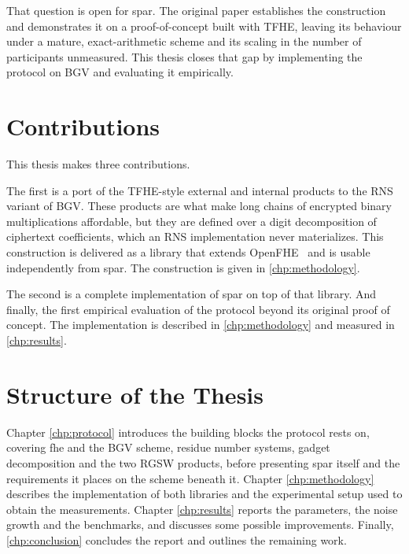 That question is open for \gls{spar}. The original paper establishes the construction and demonstrates it on a proof-of-concept built with TFHE, leaving its behaviour under a mature, exact-arithmetic scheme and its scaling in the number of participants unmeasured. This thesis closes that gap by implementing the protocol on BGV and evaluating it empirically.

\section{Contributions}
This thesis makes three contributions.

The first is a port of the TFHE-style external and internal products to the RNS variant of BGV. These products are what make long chains of encrypted binary multiplications affordable, but they are defined over a digit decomposition of ciphertext coefficients, which an RNS implementation never materializes. This construction is delivered as a library that extends OpenFHE~\cite{cryptoeprint:2022/915} and is usable independently from \gls{spar}. The construction is given in \autoref{chp:methodology}.

The second is a complete implementation of \gls{spar} on top of that library. And finally, the first empirical evaluation of the protocol beyond its original proof of concept. The implementation is described in \autoref{chp:methodology} and measured in \autoref{chp:results}.

\section{Structure of the Thesis}
Chapter \ref{chp:protocol} introduces the building blocks the protocol rests on, covering \gls{fhe} and the BGV scheme, residue number systems, gadget decomposition and the two RGSW products, before presenting \gls{spar} itself and the requirements it places on the scheme beneath it. Chapter \ref{chp:methodology} describes the implementation of both libraries and the experimental setup used to obtain the measurements. Chapter \ref{chp:results} reports the parameters, the noise growth and the benchmarks, and discusses some possible improvements. Finally, \autoref{chp:conclusion} concludes the report and outlines the remaining work.